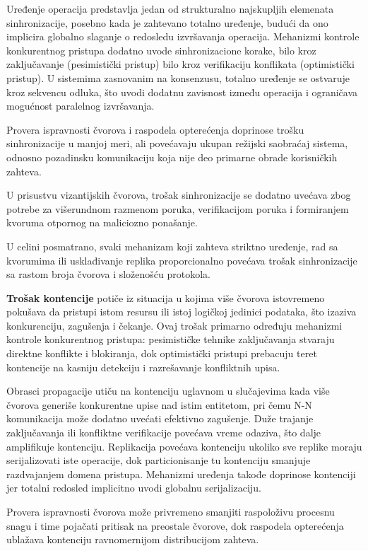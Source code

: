 Uređenje operacija predstavlja jedan od strukturalno najskupljih elemenata sinhronizacije, posebno kada je zahtevano totalno uređenje, budući da ono implicira globalno slaganje o redosledu izvršavanja operacija. Mehanizmi kontrole konkurentnog pristupa dodatno uvode sinhronizacione korake, bilo kroz zaključavanje (pesimistički pristup) bilo kroz verifikaciju konflikata (optimistički pristup). U sistemima zasnovanim na konsenzusu, totalno uređenje se ostvaruje kroz sekvencu odluka, što uvodi dodatnu zavisnost između operacija i ograničava mogućnost paralelnog izvršavanja.

Provera ispravnosti čvorova i raspodela opterećenja doprinose trošku sinhronizacije u manjoj meri, ali povećavaju ukupan režijski saobraćaj sistema, odnosno pozadinsku komunikaciju koja nije deo primarne obrade korisničkih zahteva.

U prisustvu vizantijskih čvorova, trošak sinhronizacije se dodatno uvećava zbog potrebe za višerundnom razmenom poruka, verifikacijom poruka i formiranjem kvoruma otpornog na maliciozno ponašanje.

U celini posmatrano, svaki mehanizam koji zahteva striktno uređenje, rad sa kvorumima ili usklađivanje replika proporcionalno povećava trošak sinhronizacije sa rastom broja čvorova i složenošću protokola.

\textbf{Trošak kontencije} potiče iz situacija u kojima više čvorova istovremeno pokušava da pristupi istom resursu ili istoj logičkoj jedinici podataka, što izaziva konkurenciju, zagušenja i čekanje. Ovaj trošak primarno određuju mehanizmi kontrole konkurentnog pristupa: pesimističke tehnike zaključavanja stvaraju direktne konflikte i blokiranja, dok optimistički pristupi prebacuju teret kontencije na kasniju detekciju i razrešavanje konfliktnih upisa.

Obrasci propagacije utiču na kontenciju uglavnom u slučajevima kada više čvorova generiše konkurentne upise nad istim entitetom, pri čemu N-N komunikacija može dodatno uvećati efektivno zagušenje. Duže trajanje zaključavanja ili konfliktne verifikacije povećava vreme odaziva, što dalje amplifikuje kontenciju. Replikacija povećava kontenciju ukoliko sve replike moraju serijalizovati iste operacije, dok particionisanje tu kontenciju smanjuje razdvajanjem domena pristupa. Mehanizmi uređenja takođe doprinose kontenciji jer totalni redosled implicitno uvodi globalnu serijalizaciju.

Provera ispravnosti čvorova može privremeno smanjiti raspoloživu procesnu snagu i time pojačati pritisak na preostale čvorove, dok raspodela opterećenja ublažava kontenciju ravnomernijom distribucijom zahteva.

